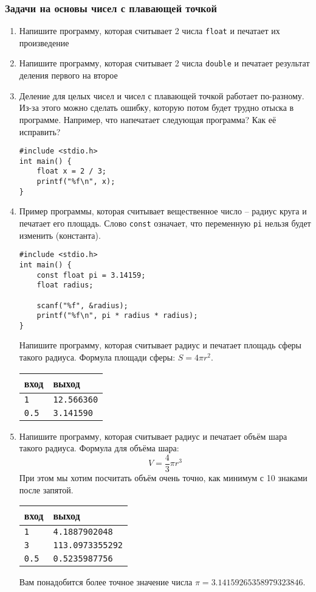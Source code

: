 \documentclass{article}
\begin{document}
\subsubsection*{Задачи на основы чисел с плавающей точкой}
\begin{enumerate}
\item Напишите программу, которая считывает 2 числа \texttt{float} и печатает их произведение
\item Напишите программу, которая считывает 2 числа \texttt{double} и печатает результат деления первого на второе
\item Деление для целых чисел и чисел с плавающей точкой работает по-разному. Из-за этого можно сделать ошибку, которую потом будет трудно отыска в программе. Например, что напечатает следующая программа? Как её исправить?
\begin{lstlisting}
#include <stdio.h>
int main() {
    float x = 2 / 3;
    printf("%f\n", x);
}
\end{lstlisting}

\item Пример программы, которая считывает вещественное число -- радиус круга и печатает его площадь. Слово \texttt{const} означает, что переменную \texttt{pi} нельзя будет изменить (константа).
\begin{lstlisting}
#include <stdio.h>
int main() {
    const float pi = 3.14159;
    float radius;
	
    scanf("%f", &radius);
    printf("%f\n", pi * radius * radius);
}
\end{lstlisting}
Напишите программу, которая считывает радиус и печатает площадь сферы такого радиуса. Формула площади сферы: $S = 4 \pi r^2$.
\begin{center}
\begin{tabular}{ l l }
 вход & выход \\ \hline
 \texttt{1} & \texttt{12.566360}  \\ 
 \texttt{0.5} & \texttt{3.141590}  \\
\end{tabular}
\end{center}

\item Напишите программу, которая считывает радиус и печатает объём шара такого радиуса. Формула для объёма шара: 
$$V = \frac{4}{3} \pi r^3$$
При этом мы хотим посчитать объём очень точно, как минимум с 10 знаками после запятой.
\begin{center}
\begin{tabular}{ l l }
 вход & выход \\ \hline
 \texttt{1} & \texttt{4.1887902048}  \\ 
 \texttt{3} & \texttt{113.0973355292}  \\ 
 \texttt{0.5} & \texttt{0.5235987756}  \\
\end{tabular}
\end{center}
Вам понадобится более точное значение числа $\pi = 3.14159265358979323846$.
\end{enumerate}
\end{document}
